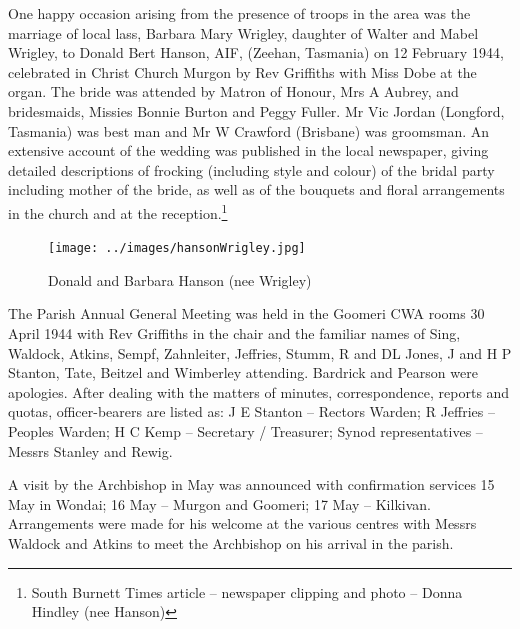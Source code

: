 One happy occasion arising from the presence of troops in the area was the marriage of local lass, Barbara Mary Wrigley, daughter of Walter and Mabel Wrigley, to Donald Bert Hanson, AIF, (Zeehan, Tasmania) on 12 February 1944, celebrated in Christ Church Murgon by Rev Griffiths with Miss Dobe at the organ. The bride was attended by Matron of Honour, Mrs A Aubrey, and bridesmaids, Missies Bonnie Burton and Peggy Fuller. Mr Vic Jordan (Longford, Tasmania) was best man and Mr W Crawford (Brisbane) was groomsman. An extensive account of the wedding was published in the local newspaper, giving detailed descriptions of frocking (including style and colour) of the bridal party including mother of the bride, as well as of the bouquets and floral arrangements in the church and at the reception.\footnote{South Burnett Times article -- newspaper clipping and photo -- Donna Hindley (nee Hanson)}








\begin{figure}
\begin{center}
\texttt{[image: ../images/hansonWrigley.jpg]}
\caption{Donald and Barbara Hanson (nee Wrigley)}
\end{center}
\end{figure}




The Parish Annual General Meeting was held in the Goomeri CWA rooms 30 April 1944 with Rev Griffiths in the chair and the familiar names of Sing, Waldock, Atkins, Sempf, Zahnleiter, Jeffries, Stumm, R and DL Jones, J and H P Stanton, Tate, Beitzel and Wimberley attending. Bardrick and Pearson were apologies. After dealing with the matters of minutes, correspondence, reports and quotas, officer-bearers are listed as: J E Stanton -- Rectors Warden; R Jeffries -- Peoples Warden; H C Kemp -- Secretary / Treasurer; Synod representatives -- Messrs Stanley and Rewig.



A visit by the Archbishop in May was announced with confirmation services 15 May in Wondai; 16 May -- Murgon and Goomeri; 17 May -- Kilkivan. Arrangements were made for his welcome at the various centres with Messrs Waldock and Atkins to meet the Archbishop on his arrival in the parish.



